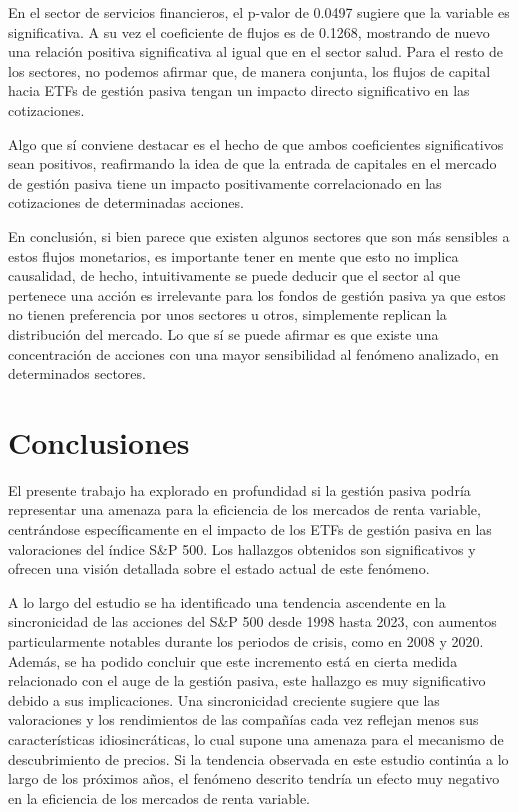 \documentclass[12pt,a4paper]{article}
\begin{document}
En el sector de servicios financieros, el p-valor de 0.0497 sugiere que la variable es significativa. A su vez el coeficiente de flujos es de 0.1268, mostrando de nuevo una relación positiva significativa al igual que en el sector salud. Para el resto de los sectores, no podemos afirmar que, de manera conjunta, los flujos de capital hacia ETFs de gestión pasiva tengan un impacto directo significativo en las cotizaciones.

Algo que sí conviene destacar es el hecho de que ambos coeficientes significativos sean positivos, reafirmando la idea de que la entrada de capitales en el mercado de gestión pasiva tiene un impacto positivamente correlacionado en las cotizaciones de determinadas acciones.

En conclusión, si bien parece que existen algunos sectores que son más sensibles a estos flujos monetarios, es importante tener en mente que esto no implica causalidad, de hecho, intuitivamente se puede deducir que el sector al que pertenece una acción es irrelevante para los fondos de gestión pasiva ya que estos no tienen preferencia por unos sectores u otros, simplemente replican la distribución del mercado. Lo que sí se puede afirmar es que existe una concentración de acciones con una mayor sensibilidad al fenómeno analizado, en determinados sectores.

\newpage

\section{Conclusiones}

El presente trabajo ha explorado en profundidad si la gestión pasiva podría representar una amenaza para la eficiencia de los mercados de renta variable, centrándose específicamente en el impacto de los ETFs de gestión pasiva en las valoraciones del índice S\&P 500. Los hallazgos obtenidos son significativos y ofrecen una visión detallada sobre el estado actual de este fenómeno.

A lo largo del estudio se ha identificado una tendencia ascendente en la sincronicidad de las acciones del S\&P 500 desde 1998 hasta 2023, con aumentos particularmente notables durante los periodos de crisis, como en 2008 y 2020. Además, se ha podido concluir que este incremento está en cierta medida relacionado con el auge de la gestión pasiva, este hallazgo es muy significativo debido a sus implicaciones. Una sincronicidad creciente sugiere que las valoraciones y los rendimientos de las compañías cada vez reflejan menos sus características idiosincráticas, lo cual supone una amenaza para el mecanismo de descubrimiento de precios. Si la tendencia observada en este estudio continúa a lo largo de los próximos años, el fenómeno descrito tendría un efecto muy negativo en la eficiencia de los mercados de renta variable.
\end{document}
